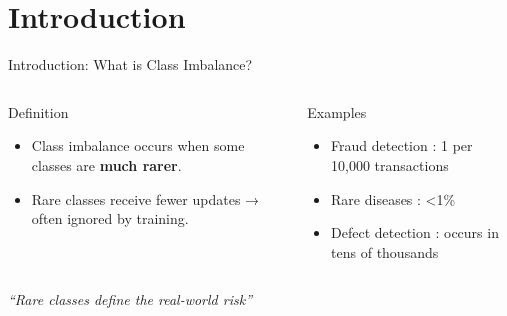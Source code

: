 \documentclass[aspectratio=169]{beamer}
\renewcommand{\textbf}[1]{\textcolor{SejongBlue}{\sf\bfseries #1}}
\begin{document}

\section{Introduction}

\begin{frame}{Introduction: What is Class Imbalance?}

\footnotesize
\vspace{-0.8em}

\begin{columns}[T,totalwidth=\textwidth]

\begin{mybox}{Definition} %
\begin{itemize}
  \item Class imbalance occurs when some classes are \textbf{much rarer}.
  \item Rare classes receive fewer updates → often ignored by training.
\end{itemize}
\end{mybox}

\begin{mybox}{Examples} %
\begin{itemize}
  \item Fraud detection : 1 per 10,000 transactions
  \item Rare diseases : <1\%
  \item Defect detection : occurs in tens of thousands
\end{itemize}
\end{mybox}

\end{columns}

\vspace{1.2em}
\centering
{\Large \textit{``Rare classes define the real-world risk''}}

\end{frame}
\end{document}
